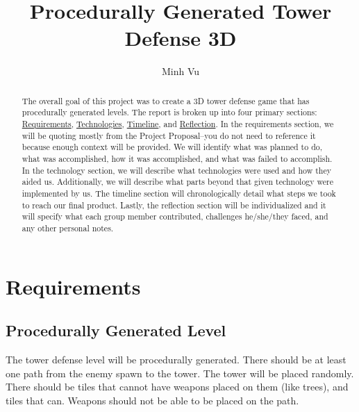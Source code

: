 \documentclass{article}
\title{Procedurally Generated Tower Defense 3D}
\author[1]{Minh Vu}
\affil[1]{George Mason University}
\begin{document}
\maketitle

\begin{abstract}
    The overall goal of this project was to create a 3D tower defense game that has procedurally generated levels. The report is broken up into four primary sections: \hyperref[sec:Requirements]{Requirements}, \hyperref[sec:Technologies]{Technologies}, \hyperref[sec:Timeline]{Timeline}, and \hyperref[sec:Reflection]{Reflection}. In the requirements section, we will be quoting mostly from the Project Proposal--you do not need to reference it because enough context will be provided. We will identify what was planned to do, what was accomplished, how it was accomplished, and what was failed to accomplish. In the technology section, we will describe what technologies were used and how they aided us. Additionally, we will describe what parts beyond that given technology were implemented by us. The timeline section will chronologically detail what steps we took to reach our final product. Lastly, the reflection section will be individualized and it will specify what each group member contributed, challenges he/she/they faced, and any other personal notes.
\end{abstract}

\newpage

\tableofcontents

\newpage

\section{Requirements}
\label{sec:Requirements}

\subsection{Procedurally Generated Level}
\label{Procedurally Generated Level}

\begin{displayquote}
    \small
    The tower defense level will be procedurally generated. There should be at least one path from the enemy spawn to the tower. The tower will be placed randomly. There should be tiles that cannot have weapons placed on them (like trees), and tiles that can. Weapons should not be able to be placed on the path.
\end{displayquote}
\end{document}

